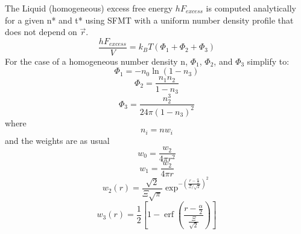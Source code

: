 \documentclass[12pt]{article}
\begin{document}
The Liquid (homogeneous) excess free energy $hF_{excess}$ is computed analytically for a given n* and t* using SFMT with a uniform number density profile that does not depend on $\vec r$. 
\begin{displaymath}{\frac{hF_{excess}}{V} = k_BT(\Phi_1+\Phi_2+\Phi_3)}\end{displaymath} 
For the case of a homogeneous number density n, $\Phi_1$, $\Phi_2$, and $\Phi_3$ simplify to:
\begin{displaymath}{\Phi_1= -n_0\ln(1-n_3)}\end{displaymath} 
\begin{displaymath}{\Phi_2= \frac{n_1n_2}{1-n_3}}\end{displaymath} 
\color{red}\begin{displaymath}{\Phi_3=\frac{n_2^3}{24\pi(1-n_3)^2}}\end{displaymath}\color{black}
where \begin{displaymath}{n_i=nw_i}\end{displaymath} 
and the weights are as usual 
\begin{equation}{w_{0}=\frac{w_{2}}{4\pi{r}^2}}\end{equation}
\begin{equation}{w_{1}=\frac{w_{2}}{4\pi{r}}}\end{equation}
\begin{equation}{ w_2(r)=\frac{\sqrt{2}}{\Xi\sqrt\pi}\exp^{-\left(\frac{r-\frac{\alpha}{2}}{\Xi/\sqrt{2}}\right)^2} }\end{equation}
\begin{equation}{w_3(r)=\frac{1}{2}}\left[1-\operatorname{erf}\left(\frac{r-\frac{\alpha}{2}}{\frac{\Xi}{\sqrt{2}}}\right)\right]\end{equation} 
\[\]
\end{document}
